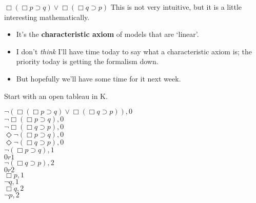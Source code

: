 \documentclass[
  14pt,
  letterpaper,
  ignorenonframetext,
]{beamer}
\providecommand{\tightlist}{%
  \setlength{\itemsep}{0pt}\setlength{\parskip}{0pt}}\usepackage{longtable,booktabs,array}
\begin{document}
\begin{frame}{\(\Box(\Box p \supset q) \vee \Box(\Box q \supset p)\)}
\protect\hypertarget{boxbox-p-supset-q-vee-boxbox-q-supset-p}{}
This is not very intuitive, but it is a little interesting
mathematically.

\begin{itemize}
\tightlist
\item
  It's the \textbf{characteristic axiom} of models that are `linear'.
\item
  I don't \emph{think} I'll have time today to say what a characteristic
  axiom is; the priority today is getting the formalism down.
\item
  But hopefully we'll have some time for it next week.
\end{itemize}
\end{frame}

\begin{frame}
Start with an open tableau in K.

\begin{center}
$\neg(\Box(\Box p \supset q) \vee \Box(\Box q \supset p)), 0$ \\
$\neg \Box(\Box p \supset q), 0$ \\
$\neg \Box(\Box q \supset p), 0$ \\
$\Diamond \neg(\Box p \supset q), 0$ \\
$\Diamond \neg(\Box q \supset p), 0$ \\
$\neg(\Box p \supset q), 1$ \\
$0r1$ \\
$\neg(\Box q \supset p), 2$ \\
$0r2$ \\
$\Box p, 1$ \\
$\neg q, 1$ \\
$\Box q, 2$ \\
$\neg p, 2$ \\
\end{center}
\end{frame}
\end{document}
